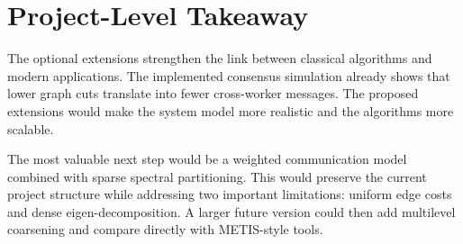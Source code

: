 \documentclass[11pt]{article}
\begin{document}
\section{Project-Level Takeaway}

The optional extensions strengthen the link between classical algorithms and
modern applications. The implemented consensus simulation already shows that
lower graph cuts translate into fewer cross-worker messages. The proposed
extensions would make the system model more realistic and the algorithms more
scalable.

The most valuable next step would be a weighted communication model combined
with sparse spectral partitioning. This would preserve the current project
structure while addressing two important limitations: uniform edge costs and
dense eigen-decomposition. A larger future version could then add multilevel
coarsening and compare directly with METIS-style tools.
\end{document}
